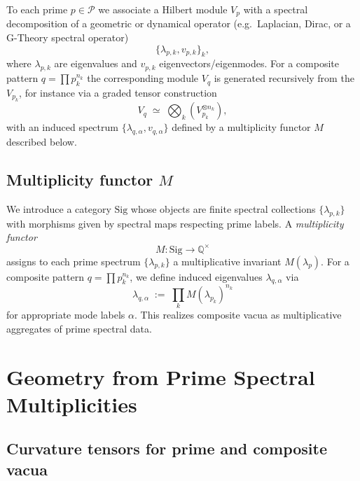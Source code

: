 \documentclass[11pt]{article}
\begin{document}
To each prime \(p\in \mathcal{P}\) we associate a Hilbert module \(V_p\) with a spectral decomposition of a geometric or dynamical operator (e.g.\ Laplacian, Dirac, or a G-Theory spectral operator)
\begin{equation}
  \{\lambda_{p,k}, v_{p,k}\}_{k} ,
\end{equation}
where \(\lambda_{p,k}\) are eigenvalues and \(v_{p,k}\) eigenvectors/eigenmodes.
For a composite pattern \(q = \prod p_k^{n_k}\) the corresponding module \(V_q\) is generated recursively from the \(V_{p_k}\), for instance via a graded tensor construction
\begin{equation}
  V_q \;\simeq\;
  \bigotimes_k \left( V_{p_k}^{\otimes n_k} \right),
\end{equation}
with an induced spectrum \(\{\lambda_{q,\alpha}, v_{q,\alpha}\}\) defined by a multiplicity functor \(M\) described below.

\subsection{Multiplicity functor \texorpdfstring{\(M\)}{M}}

We introduce a category \(\mathrm{Sig}\) whose objects are finite spectral collections \(\{\lambda_{p,k}\}\) with morphisms given by spectral maps respecting prime labels.
A \emph{multiplicity functor}
\begin{equation}
  M:\mathrm{Sig} \to \mathbb{Q}^\times
\end{equation}
assigns to each prime spectrum \(\{\lambda_{p,k}\}\) a multiplicative invariant \(M(\lambda_p)\).
For a composite pattern \(q = \prod p_k^{n_k}\), we define induced eigenvalues \(\lambda_{q,\alpha}\) via
\begin{equation}
  \lambda_{q,\alpha}
  \;:=\;
  \prod_k M(\lambda_{p_k})^{n_k}
\end{equation}
for appropriate mode labels \(\alpha\).
This realizes composite vacua as multiplicative aggregates of prime spectral data.

\section{Geometry from Prime Spectral Multiplicities}

\subsection{Curvature tensors for prime and composite vacua}
\end{document}
